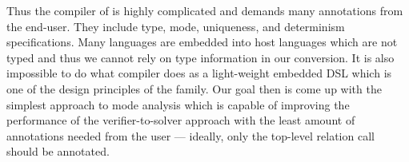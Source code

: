 Thus the compiler of \merc is highly complicated and demands many annotations from the end-user.
They include type, mode, uniqueness, and determinism specifications.
Many \mk languages are embedded into host languages which are not typed and thus we cannot rely on type information in our conversion.
It is also impossible to do what \merc compiler does as a light-weight embedded DSL which is one of the design principles of the \mk family.
Our goal then is come up with the simplest approach to mode analysis which is capable of improving the performance of the verifier-to-solver approach with the least amount of annotations needed from the user --- ideally, only the top-level relation call should be annotated.




